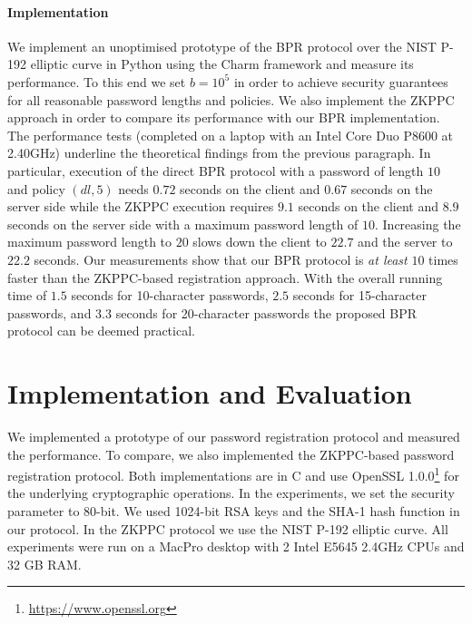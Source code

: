 \paragraph{Implementation}
We implement an unoptimised prototype of the \ac{BPR} protocol over the \ac{NIST} P-192 elliptic curve \cite{nistEC} in Python using the Charm framework \cite{charm13} and measure its performance.
To this end we set $b=10^5$ in order to achieve security guarantees for all reasonable password lengths and policies.
We also implement the \ac{ZKPPC} approach in order to compare its performance with our BPR implementation.
The performance tests (completed on a laptop with an Intel Core Duo P8600 at 2.40GHz) underline the theoretical findings from the previous paragraph. 
In particular, execution of the direct \ac{BPR} protocol with a password of length $10$ and policy $(dl, 5)$ needs $0.72$ seconds on the client and $0.67$ seconds on the server side while the \ac{ZKPPC} execution requires $9.1$ seconds on the client and $8.9$ seconds on the server side with a maximum password length of $10$.
Increasing the maximum password length to $20$ slows down the client to $22.7$ and the server to $22.2$ seconds.
Our measurements show that our \ac{BPR} protocol is \emph{at least} $10$ times faster than the \ac{ZKPPC}-based registration approach.
With the overall running time of $1.5$ seconds for 10-character passwords, $2.5$ seconds for 15-character passwords, and $3.3$ seconds for 20-character passwords the proposed \ac{BPR} protocol can be deemed practical.

\section{Implementation and Evaluation}\label{sec:evaluation}
We implemented a prototype of our password registration protocol and measured the performance. 
To compare, we also implemented the \ac{ZKPPC}-based password registration protocol. 
Both implementations are in C and use OpenSSL 1.0.0\footnote{\url{https://www.openssl.org}} for the underlying cryptographic operations. 
In the experiments, we set the security parameter to 80-bit. We used 1024-bit RSA keys and the \mbox{{SHA-}1} hash function in our protocol. 
In the \ac{ZKPPC} protocol we use the \ac{NIST} P-192 elliptic curve. 
All experiments were run on a MacPro desktop with 2 Intel E5645 2.4GHz CPUs and 32 GB RAM.

